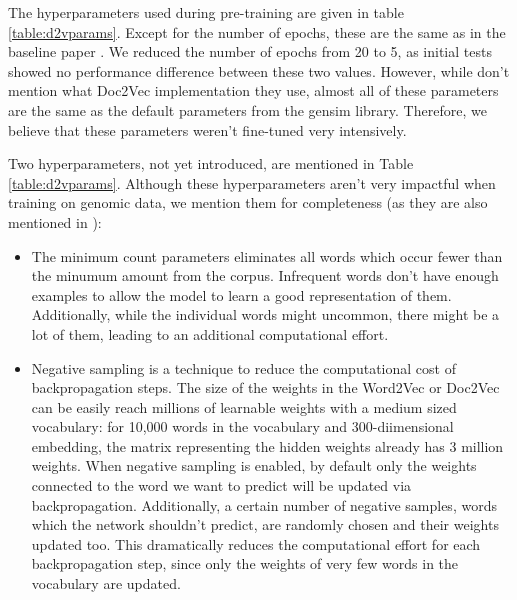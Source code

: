 The hyperparameters used during pre-training are given in table \ref{table:d2vparams}. Except for the number of epochs, these are the same as in the baseline paper \cite{d2vsplicing}. We reduced the number of epochs from 20 to 5, as initial tests showed no performance difference between these two values. However, while \cite{d2vsplicing} don't mention what Doc2Vec implementation they use, almost all of these parameters are the same as the default parameters from the gensim library. Therefore, we believe that these parameters weren't fine-tuned very intensively. 

Two hyperparameters, not yet introduced, are mentioned in Table \ref{table:d2vparams}. Although these hyperparameters aren't very impactful when training on genomic data, we mention them for completeness (as they are also mentioned in \cite{d2vsplicing}):
\begin{itemize}
	\item The minimum count parameters eliminates all words which occur fewer than the minumum amount from the corpus. Infrequent words don't have enough examples to allow the model to learn a good representation of them. Additionally, while the individual words might uncommon, there might be a lot of them, leading to an additional computational effort.
	
	\item Negative sampling \cite{w2v2} 
	is a technique to reduce the computational cost of backpropagation steps. The size of the weights in the Word2Vec or Doc2Vec can be easily reach millions of learnable weights with a medium sized vocabulary: for 10,000 words in the vocabulary and 300-diimensional embedding, the matrix representing the hidden weights already has 3 million weights. 
	When negative sampling is enabled, by default only the weights connected to the word we want to predict will be updated via backpropagation. Additionally, a certain number of negative samples, words which the network shouldn't predict, are randomly chosen and their weights updated too. This dramatically reduces the computational effort for each backpropagation step, since only the weights of very few words in the vocabulary are updated. 
\end{itemize}



 

